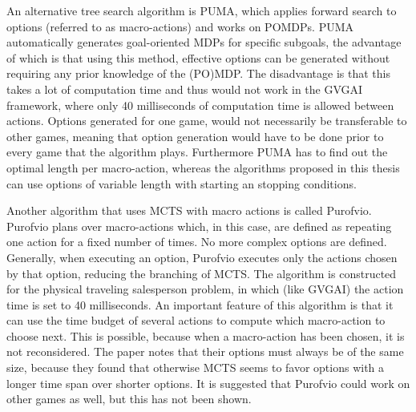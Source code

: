 An alternative tree search algorithm is PUMA, which applies forward search to
options (referred to as macro-actions) and works on POMDPs.  PUMA automatically
generates goal-oriented MDPs for specific subgoals, the advantage of which is
that using this method, effective options can be generated without requiring any
prior knowledge of the (PO)MDP. The disadvantage is that this takes a lot of
computation time and thus would not work in the GVGAI framework, where only 40
milliseconds of computation time is allowed between actions. Options generated
for one game, would not necessarily be transferable to other games, meaning that
option generation would have to be done prior to every game that the algorithm
plays. Furthermore PUMA has to find out the optimal length per macro-action,
whereas the algorithms proposed in this thesis can use options of variable
length with starting an stopping conditions.

Another algorithm that uses MCTS with macro actions is called Purofvio.
Purofvio plans over macro-actions which, in this case, are defined as repeating
one action for a fixed number of times. No more complex options are defined.
Generally, when executing an option, Purofvio executes only the actions chosen
by that option, reducing the branching of MCTS. The algorithm is constructed for
the physical traveling salesperson problem, in which (like GVGAI) the action
time is set to 40 milliseconds. An important feature of this algorithm is that it can use
the time budget of several actions to compute which macro-action to choose next.
This is possible, because when a macro-action has been chosen, it is not
reconsidered. The paper notes that their options must always be of the same
size, because they found that otherwise MCTS seems to favor options with a
longer time span over shorter options. It is suggested that Purofvio could work
on other games as well, but this has not been shown.
